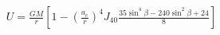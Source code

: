 \documentclass[10pt]{article}
\begin{document}
\begin{align*}U = \frac{G M}{r} \left[ 1 - \left( \frac{a_{e}}{r} \right)^4 J_{40} \frac{ 35 \sin^4 \beta - 240 \sin^2 \beta + 24}{8} \right]\end{align*}
\end{document}
